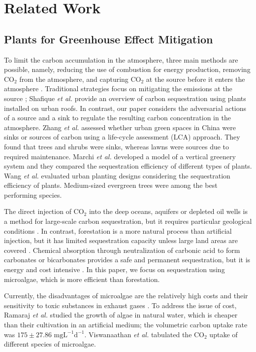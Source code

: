 \section{Related Work}
\label{sec:relWork}
\subsection{Plants for Greenhouse Effect Mitigation}
To limit the carbon accumulation in the atmosphere, three main methods are possible, namely, reducing the use of combustion for energy production, removing $\text{CO}_2$ from the atmosphere, and capturing $\text{CO}_2$ at the source before it enters the atmosphere \cite{benemann1997co2}. Traditional strategies focus on mitigating the emissions at the source \cite{shafique2020overview}; Shafique \textit{et al.} \cite{shafique2020overview} provide an overview of carbon sequestration using plants installed on urban roofs. In contrast, our paper considers the adversarial actions of a source and a sink to regulate the resulting carbon concentration in the atmosphere. Zhang \textit{et al.} \cite{zhang2022urban} assessed whether urban green spaces in China were sinks or sources of carbon using a life-cycle assessment (LCA) approach. They found that trees and shrubs were sinks, whereas lawns were sources due to required maintenance. Marchi \textit{et al.} \cite{marchi2015carbon} developed a model of a vertical greenery system and they compared the sequestration efficiency of different types of plants. Wang \textit{et al.} \cite{wang2021promoting} evaluated urban planting designs considering the sequestration efficiency of plants. Medium-sized evergreen trees were among the best performing species.    
    
The direct injection of $\text{CO}_2$ into the deep oceans, aquifers or depleted oil wells is a method for large-scale carbon sequestration, but it requires particular geological conditions \cite{zhou2017bio}. In contrast, forestation is a more natural process than artificial injection, but it has limited sequestration capacity unless large land areas are covered \cite{zhou2017bio}. Chemical absorption through neutralization of carbonic acid to form carbonates or bicarbonates provides a safe and permanent sequestration, but it is energy and cost intensive \cite{zhou2017bio}. In this paper, we focus on sequestration using microalgae, which is more efficient than forestation. 

Currently, the disadvantages of microalgae are the relatively high costs and their sensitivity to toxic substances in exhaust gases \cite{zhou2017bio}. To address the issue of cost, Ramaraj \textit{et al.} \cite{ramaraj2015biomass} studied the growth of algae in natural water, which is cheaper than their cultivation in an artificial medium; the volumetric carbon uptake rate was $175 \pm 27.86 \text{ mg}\text{L}^{-1}\text{d}^{-1}$. Viswanaathan \textit{et al.} \cite{viswanaathan2022integrated} tabulated the $\text{CO}_2$ uptake of different species of microalgae.  

